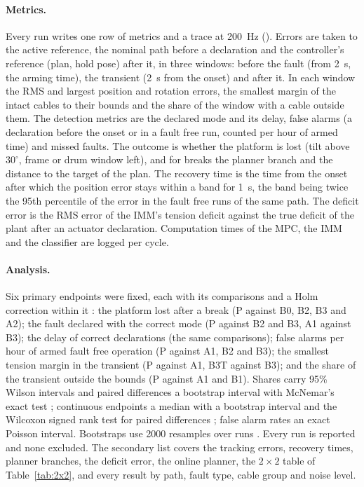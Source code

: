 \documentclass[10pt]{article}
\begin{document}
\paragraph{Metrics.} Every run writes one row of metrics and a trace at 200~Hz (). Errors are taken to the active reference, the nominal path before a declaration and the controller's reference (plan, hold pose) after it, in three windows: before the fault (from 2~s, the arming time), the transient (2~s from the onset) and after it. In each window the RMS and largest position and rotation errors, the smallest margin of the intact cables to their bounds and the share of the window with a cable outside them. The detection metrics are the declared mode and its delay, false alarms (a declaration before the onset or in a fault free run, counted per hour of armed time) and missed faults. The outcome is whether the platform is lost (tilt above $30^\circ$, frame or drum window left), and for breaks the planner branch and the distance to the target of the plan. The recovery time is the time from the onset after which the position error stays within a band for 1~s, the band being twice the 95th percentile of the error in the fault free runs of the same path. The deficit error is the RMS error of the IMM's tension deficit against the true deficit of the plant after an actuator declaration. Computation times of the MPC, the IMM and the classifier are logged per cycle.

\paragraph{Analysis.} Six primary endpoints were fixed, each with its comparisons and a Holm correction within it \citep{holm1979}: the platform lost after a break (P against B0, B2, B3 and A2); the fault declared with the correct mode (P against B2 and B3, A1 against B3); the delay of correct declarations (the same comparisons); false alarms per hour of armed fault free operation (P against A1, B2 and B3); the smallest tension margin in the transient (P against A1, B3T against B3); and the share of the transient outside the bounds (P against A1 and B1). Shares carry 95\% Wilson intervals \citep{wilson1927} and paired differences a bootstrap interval with McNemar's exact test \citep{mcnemar1947}; continuous endpoints a median with a bootstrap interval and the Wilcoxon signed rank test for paired differences \citep{wilcoxon1945}; false alarm rates an exact Poisson interval. Bootstraps use 2000 resamples over runs \citep{efron1993bootstrap}. Every run is reported and none excluded. The secondary list covers the tracking errors, recovery times, planner branches, the deficit error, the online planner, the $2\times2$ table of Table~\ref{tab:2x2}, and every result by path, fault type, cable group and noise level.
\end{document}
